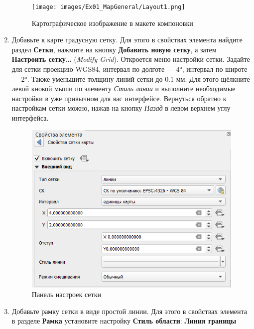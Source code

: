 \documentclass[
  12pt,
]{book}
\begin{document}
\begin{enumerate}
  \begin{figure}
  \centering
  \texttt{[image: images/Ex01\_MapGeneral/Layout1.png]}
  \caption{Картографическое изображение в макете компоновки}
  \end{figure}
\item
  Добавьте к карте градусную сетку. Для этого в свойствах элемента найдите раздел \textbf{Сетки}, нажмите на кнопку \textbf{Добавить новую сетку}, а затем \textbf{Настроить сетку\ldots{}} (\emph{Modify Grid}). Откроется меню настройки сетки. Задайте для сетки проекцию WGS84, интервал по долготе --- \(4°\), интервал по широте --- \(2°\). Также уменьшите толщину линий сетки до \(0.1\) мм. Для этого щёлкните левой кнокой мыши по элементу \emph{Стиль линии} и выполните необходимые настройки в уже привычном для вас интерфейсе. Вернуться обратно к настройкам сетки можно, нажав на кнопку \emph{Назад} в левом верхнем углу интерфейса.

  \begin{figure}
  \centering
  \includegraphics{images/Ex01_MapGeneral/graticule.png}
  \caption{Панель настроек сетки}
  \end{figure}
\item
  Добавьте рамку сетки в виде простой линии. Для этого в свойствах элемента в разделе \textbf{Рамка} установите настройку \textbf{Стиль области}: \textbf{Линия границы}


\end{enumerate}
\end{document}
